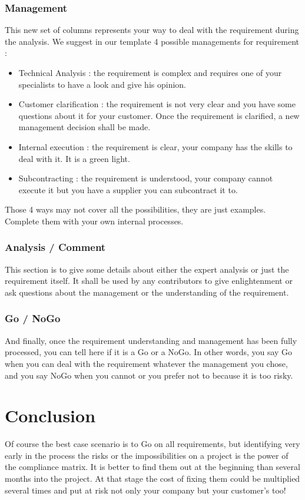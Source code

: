 \subsubsection{Management}
This new set of columns represents your way to deal with the requirement during the analysis. We suggest in our template 4 possible managements for requirement :

\begin{itemize}
    \item Technical Analysis : the requirement is complex and requires one of your specialists to have a look and give his opinion.
    \item Customer clarification : the requirement is not very clear and you have some questions about it for your customer. Once the requirement is clarified, a new management decision shall be made.
    \item Internal execution : the requirement is clear, your company has the skills to deal with it. It is a green light.
    \item Subcontracting : the requirement is understood, your company cannot execute it but you have a supplier you can subcontract it to.
\end{itemize}

Those 4 ways may not cover all the possibilities, they are just examples. Complete them with your own internal processes.

\subsubsection{Analysis / Comment}
This section is to give some details about either the expert analysis or just the requirement itself. It shall be used by any contributors to give enlightenment or ask questions about the management or the understanding of the requirement.

\subsubsection{Go / NoGo}
And finally, once the requirement understanding and management has been fully processed, you can tell here if it is a Go or a NoGo. In other words, you say Go when you can deal with the requirement whatever the management you chose, and you say NoGo when you cannot or you prefer not to because it is too risky.

\section{Conclusion}
Of course the best case scenario is to Go on all requirements, but identifying very early in the process the risks or the impossibilities on a project is the power of the compliance matrix. It is better to find them out at the beginning than several months into the project. At that stage the cost of fixing them could be multiplied several times and put at risk not only your company but your customer’s too!

